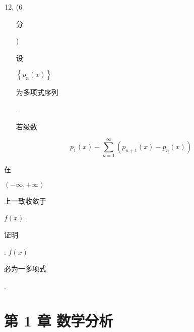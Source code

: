 \documentclass[10pt]{article}
\begin{document}
\begin{enumerate}
  \setcounter{enumi}{11}
  \item (6 \begin{CJK}{UTF8}{mj}分\end{CJK}) \begin{CJK}{UTF8}{mj}设\end{CJK} $\left\{p_{n}(x)\right\}$ \begin{CJK}{UTF8}{mj}为多项式序列\end{CJK}. \begin{CJK}{UTF8}{mj}若级数\end{CJK}
\end{enumerate}
$$
p_{1}(x)+\sum_{n=1}^{\infty}\left(p_{n+1}(x)-p_{n}(x)\right)
$$
\begin{CJK}{UTF8}{mj}在\end{CJK} $(-\infty,+\infty)$ \begin{CJK}{UTF8}{mj}上一致收敛于\end{CJK} $f(x)$. \begin{CJK}{UTF8}{mj}证明\end{CJK}: $f(x)$ \begin{CJK}{UTF8}{mj}必为一多项式\end{CJK}.

\section{第 1 章 数学分析}
\end{document}
